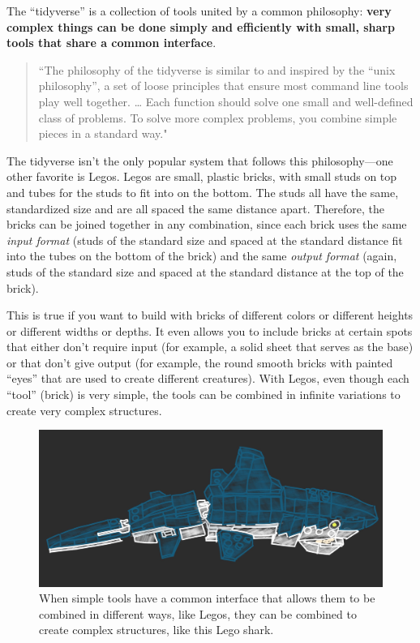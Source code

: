 \documentclass[]{tufte-book}
\begin{document}
The ``tidyverse'' is a collection of tools united by a common philosophy: \textbf{very
complex things can be done simply and efficiently with small, sharp tools
that share a common interface}.

\begin{quote}
``The philosophy of the tidyverse is similar to
and inspired by the ``unix philosophy'', a set of loose principles that ensure
most command line tools play well together. \ldots{} Each function should solve one
small and well-defined class of problems. To solve more complex problems, you
combine simple pieces in a standard way." \citep{ross2017declutter}
\end{quote}

The tidyverse isn't the only popular system that follows this philosophy---one
other favorite is Legos. Legos are small, plastic bricks, with small studs on
top and tubes for the studs to fit into on the bottom. The studs all have the
same, standardized size and are all spaced the same distance apart. Therefore,
the bricks can be joined together in any combination, since each brick uses the
same \emph{input format} (studs of the standard size and spaced at the standard
distance fit into the tubes on the bottom of the brick) and the same \emph{output
format} (again, studs of the standard size and spaced at the standard distance
at the top of the brick).

This is true if you want to build with bricks of different colors or different
heights or different widths or depths. It even allows you to include bricks at
certain spots that either don't require input (for example, a solid sheet that
serves as the base) or that don't give output (for example, the round smooth
bricks with painted ``eyes'' that are used to create different creatures). With
Legos, even though each ``tool'' (brick) is very simple, the tools can be combined
in infinite variations to create very complex structures.

\begin{figure}
\includegraphics[width=\textwidth]{figures/legoshark} \caption[When simple tools have a common interface that allows them to be combined in different ways, like Legos, they can be combined to create complex structures, like this Lego shark]{When simple tools have a common interface that allows them to be combined in different ways, like Legos, they can be combined to create complex structures, like this Lego shark.}\label{fig:legoshark}
\end{figure}
\end{document}
